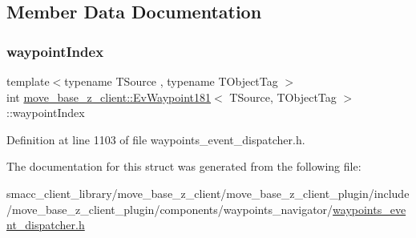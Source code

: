\subsection{Member Data Documentation}
\mbox{\label{structmove__base__z__client_1_1EvWaypoint181_aa5826b17e0995563f41f59bdbcc1f0ec}} 
\subsubsection{\texorpdfstring{waypoint\+Index}{waypointIndex}}
{\footnotesize\ttfamily template$<$typename T\+Source , typename T\+Object\+Tag $>$ \\
int \hyperlink{structmove__base__z__client_1_1EvWaypoint181}{move\+\_\+base\+\_\+z\+\_\+client\+::\+Ev\+Waypoint181}$<$ T\+Source, T\+Object\+Tag $>$\+::waypoint\+Index}



Definition at line 1103 of file waypoints\+\_\+event\+\_\+dispatcher.\+h.



The documentation for this struct was generated from the following file\+:\begin{DoxyCompactItemize}
\item 
smacc\+\_\+client\+\_\+library/move\+\_\+base\+\_\+z\+\_\+client/move\+\_\+base\+\_\+z\+\_\+client\+\_\+plugin/include/move\+\_\+base\+\_\+z\+\_\+client\+\_\+plugin/components/waypoints\+\_\+navigator/\hyperlink{waypoints__event__dispatcher_8h}{waypoints\+\_\+event\+\_\+dispatcher.\+h}\end{DoxyCompactItemize}
